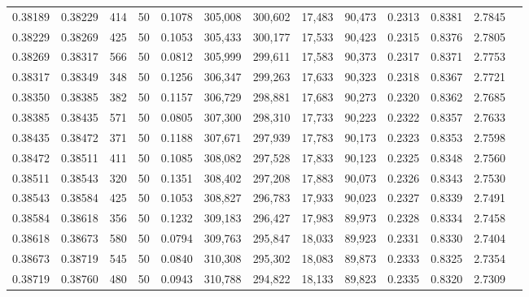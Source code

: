 \begin{tabular}{rrrrrrrrrrrrr}
0.38189 & 0.38229 &   414 &  50 &                                     0.1078 & 305,008 & 300,602 &  17,483 &  90,473 & 0.2313 & 0.8381 & 2.7845 \\
0.38229 & 0.38269 &   425 &  50 &                                     0.1053 & 305,433 & 300,177 &  17,533 &  90,423 & 0.2315 & 0.8376 & 2.7805 \\
0.38269 & 0.38317 &   566 &  50 &                                     0.0812 & 305,999 & 299,611 &  17,583 &  90,373 & 0.2317 & 0.8371 & 2.7753 \\
0.38317 & 0.38349 &   348 &  50 &                                     0.1256 & 306,347 & 299,263 &  17,633 &  90,323 & 0.2318 & 0.8367 & 2.7721 \\
0.38350 & 0.38385 &   382 &  50 &                                     0.1157 & 306,729 & 298,881 &  17,683 &  90,273 & 0.2320 & 0.8362 & 2.7685 \\
0.38385 & 0.38435 &   571 &  50 &                                     0.0805 & 307,300 & 298,310 &  17,733 &  90,223 & 0.2322 & 0.8357 & 2.7633 \\
0.38435 & 0.38472 &   371 &  50 &                                     0.1188 & 307,671 & 297,939 &  17,783 &  90,173 & 0.2323 & 0.8353 & 2.7598 \\
0.38472 & 0.38511 &   411 &  50 &                                     0.1085 & 308,082 & 297,528 &  17,833 &  90,123 & 0.2325 & 0.8348 & 2.7560 \\
0.38511 & 0.38543 &   320 &  50 &                                     0.1351 & 308,402 & 297,208 &  17,883 &  90,073 & 0.2326 & 0.8343 & 2.7530 \\
0.38543 & 0.38584 &   425 &  50 &                                     0.1053 & 308,827 & 296,783 &  17,933 &  90,023 & 0.2327 & 0.8339 & 2.7491 \\
0.38584 & 0.38618 &   356 &  50 &                                     0.1232 & 309,183 & 296,427 &  17,983 &  89,973 & 0.2328 & 0.8334 & 2.7458 \\
0.38618 & 0.38673 &   580 &  50 &                                     0.0794 & 309,763 & 295,847 &  18,033 &  89,923 & 0.2331 & 0.8330 & 2.7404 \\
0.38673 & 0.38719 &   545 &  50 &                                     0.0840 & 310,308 & 295,302 &  18,083 &  89,873 & 0.2333 & 0.8325 & 2.7354 \\
0.38719 & 0.38760 &   480 &  50 &                                     0.0943 & 310,788 & 294,822 &  18,133 &  89,823 & 0.2335 & 0.8320 & 2.7309 \\

\end{tabular}
